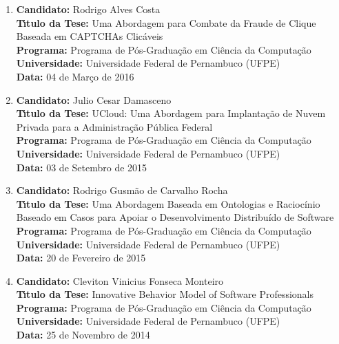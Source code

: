 \documentclass[a4paper,oneside,10pt]{article}
\begin{document}
\begin{enumerate}
\renewcommand{\labelenumi}{{\large\bfseries\arabic{enumi}.}}
\vspace{0.3cm}

\item       \textbf{Candidato:} Rodrigo Alves Costa \mbox{} \\
            \textbf{T\'{\i}tulo da Tese:} Uma Abordagem para Combate da Fraude de Clique Baseada em CAPTCHAs Clicáveis\\
            \textbf{Programa:} Programa de Pós-Graduação em Ciência da Computação\\
            \textbf{Universidade:} Universidade Federal de Pernambuco (UFPE)\\
            \textbf{Data:} 04 de Março de 2016

\item       \textbf{Candidato:} Julio Cesar Damasceno \mbox{} \\
            \textbf{T\'{\i}tulo da Tese:} UCloud: Uma Abordagem para Implantação de Nuvem Privada para a Administração Pública Federal\\
            \textbf{Programa:} Programa de Pós-Graduação em Ciência da Computação\\
            \textbf{Universidade:} Universidade Federal de Pernambuco (UFPE)\\
            \textbf{Data:} 03 de Setembro de 2015

\item       \textbf{Candidato:} Rodrigo Gusmão de Carvalho Rocha \mbox{} \\
            \textbf{T\'{\i}tulo da Tese:} Uma Abordagem Baseada em Ontologias e Raciocínio Baseado em Casos para Apoiar o Desenvolvimento Distribuído de Software\\
            \textbf{Programa:} Programa de Pós-Graduação em Ciência da Computação\\
            \textbf{Universidade:} Universidade Federal de Pernambuco (UFPE)\\
            \textbf{Data:} 20 de Fevereiro de 2015

\item       \textbf{Candidato:} Cleviton Vinicius Fonseca Monteiro \mbox{} \\
            \textbf{T\'{\i}tulo da Tese:} Innovative Behavior Model of Software Professionals\\
            \textbf{Programa:} Programa de Pós-Graduação em Ciência da Computação\\
            \textbf{Universidade:} Universidade Federal de Pernambuco (UFPE)\\
            \textbf{Data:} 25 de Novembro de 2014
\end{enumerate}
\end{document}
